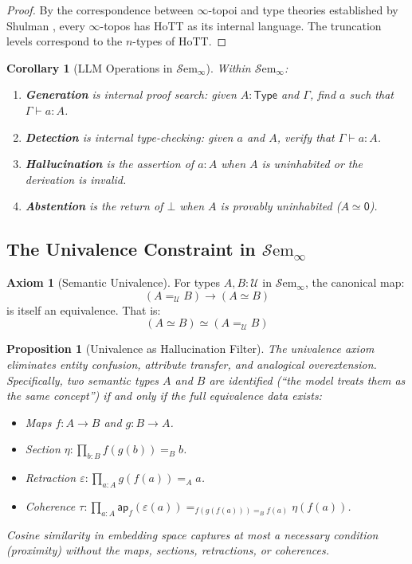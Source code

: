 \documentclass[11pt,a4paper]{article}
\theoremstyle{plain}
\newtheorem{proposition}[theorem]{Proposition}
\newtheorem{corollary}[theorem]{Corollary}
\theoremstyle{definition}
\newtheorem{axiom}[theorem]{Axiom}
\theoremstyle{remark}
\newcommand{\Type}{\mathsf{Type}}
\begin{document}
\begin{proof}
By the correspondence between $\infty$-topoi and type theories established by Shulman \cite{shulman2019all}, every $\infty$-topos has HoTT as its internal language. The truncation levels correspond to the $n$-types of HoTT.
\end{proof}

\begin{corollary}[LLM Operations in $\mathcal{S}\mathrm{em}_\infty$]\label{cor:llm-in-topos}
Within $\mathcal{S}\mathrm{em}_\infty$:
\begin{enumerate}[nosep]
  \item \textbf{Generation} is internal proof search: given $A : \Type$ and $\Gamma$, find $a$ such that $\Gamma \vdash a : A$.
  \item \textbf{Detection} is internal type-checking: given $a$ and $A$, verify that $\Gamma \vdash a : A$.
  \item \textbf{Hallucination} is the assertion of $a : A$ when $A$ is uninhabited or the derivation is invalid.
  \item \textbf{Abstention} is the return of $\bot$ when $A$ is provably uninhabited ($A \simeq \mathsf{0}$).
\end{enumerate}
\end{corollary}

\subsection{The Univalence Constraint in \texorpdfstring{$\mathcal{S}\mathrm{em}_\infty$}{Sem-infinity}}

\begin{axiom}[Semantic Univalence]\label{ax:univalence}
For types $A, B : \mathcal{U}$ in $\mathcal{S}\mathrm{em}_\infty$, the canonical map:
\[
(A =_{\mathcal{U}} B) \to (A \simeq B)
\]
is itself an equivalence. That is:
\[
(A \simeq B) \simeq (A =_{\mathcal{U}} B)
\]
\end{axiom}

\begin{proposition}[Univalence as Hallucination Filter]\label{prop:univalence-filter}
The univalence axiom eliminates entity confusion, attribute transfer, and analogical overextension. Specifically, two semantic types $A$ and $B$ are identified (``the model treats them as the same concept'') if and only if the full equivalence data exists:
\begin{itemize}[nosep]
  \item Maps $f : A \to B$ and $g : B \to A$.
  \item Section $\eta : \prod_{b:B} f(g(b)) =_B b$.
  \item Retraction $\varepsilon : \prod_{a:A} g(f(a)) =_A a$.
  \item Coherence $\tau : \prod_{a:A} \mathsf{ap}_f(\varepsilon(a)) =_{f(g(f(a))) =_B f(a)} \eta(f(a))$.
\end{itemize}
Cosine similarity in embedding space captures at most a necessary condition (proximity) without the maps, sections, retractions, or coherences.
\end{proposition}
\end{document}
